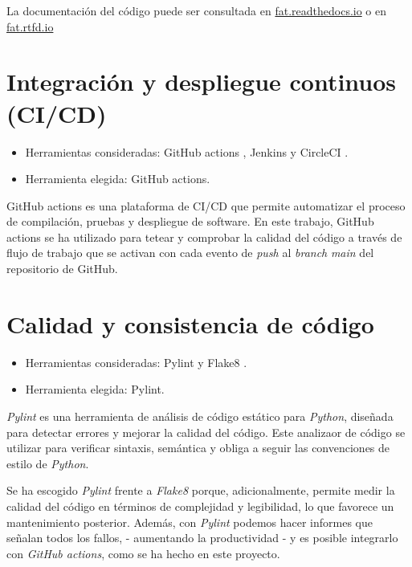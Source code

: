 La documentación del código puede ser consultada en \href{https://fat.readthedocs.io/es/latest/index.html}{fat.readthedocs.io} o en \href{https://fat.readthedocs.io/es/latest/}{fat.rtfd.io}


\section{Integración y despliegue continuos (CI/CD)}\label{ci_cd}

\begin{itemize}
\tightlist
\item
  Herramientas consideradas: GitHub actions \citep{online:github_actions}, Jenkins \citep{online:jenkins} y CircleCI \citep{online:circle_ci}.
\item
  Herramienta elegida: GitHub actions.
\end{itemize}

GitHub actions es una plataforma de CI/CD que permite automatizar el proceso de compilación,
pruebas y despliegue de software. En este trabajo, GitHub actions se ha utilizado para 
tetear y comprobar la calidad del código a través de flujo de trabajo que se activan con 
cada evento de \emph{push} al \emph{branch} \emph{main} del repositorio de GitHub. 


\section{Calidad y consistencia de código}\label{calidad_codigo}

\begin{itemize}
\tightlist
\item
  Herramientas consideradas: Pylint \citep{online:pylint} y Flake8 \citep{online:flake8}.
\item
  Herramienta elegida: Pylint.
\end{itemize}

\emph{Pylint} es una herramienta de análisis de código estático para \emph{Python}, 
diseñada para detectar errores y mejorar la calidad del código. Este analizaor de código se
utilizar para verificar sintaxis, semántica y obliga a seguir las convenciones de estilo
de \emph{Python}. 

Se ha escogido \emph{Pylint} frente a \emph{Flake8} porque, adicionalmente, permite medir la calidad del código en términos de complejidad y legibilidad, lo que favorece un mantenimiento posterior. Además, con \emph{Pylint} podemos hacer informes que señalan todos los fallos, 
- aumentando la productividad - y es posible integrarlo con \emph{GitHub actions}, como se ha hecho en este proyecto.


